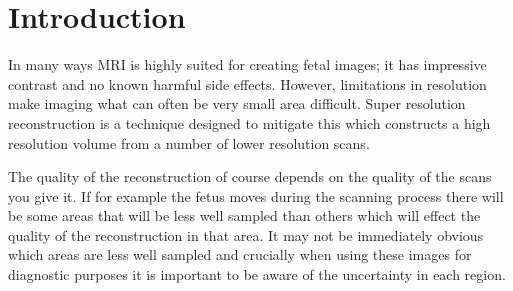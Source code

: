 









\chapter{Introduction}

In many ways MRI is highly suited for creating fetal images; it has impressive contrast and no known harmful side effects. However, limitations in resolution make imaging what can often be very small area difficult. Super resolution reconstruction is a technique designed to mitigate this which constructs a high resolution volume from a number of lower resolution scans.

The quality of the reconstruction of course depends on the quality of the scans you give it. If for example the fetus moves during the scanning process there will be some areas that will be less well sampled than others which will effect the quality of the reconstruction in that area. It may not be immediately obvious which areas are less well sampled and crucially when using these images for diagnostic purposes it is important to be aware of the uncertainty in each region.

